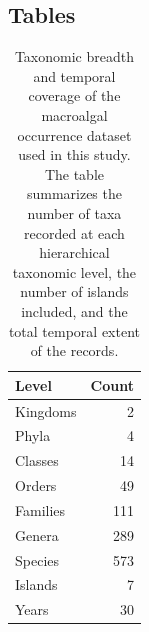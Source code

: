 \documentclass[a4paper,fleqn]{cas-sc}
\begin{document}
\subsection{Tables}
\begin{table}[width=\linewidth,cols=2,pos=!htbp]
\caption{Taxonomic breadth and temporal coverage of the macroalgal occurrence dataset used in this study. The table summarizes the number of taxa recorded at each hierarchical taxonomic level, the number of islands included, and the total temporal extent of the records.}
\small
\begin{tabular*}{\tblwidth}{@{} L R @{}}
\toprule
Level & Count \\
\midrule
Kingdoms & 2 \\
Phyla & 4 \\
Classes & 14 \\
Orders & 49 \\
Families & 111 \\
Genera & 289 \\
Species & 573 \\
Islands & 7 \\
Years & 30 \\
\bottomrule
\end{tabular*}
\label{tab:1}
\end{table}
\end{document}
